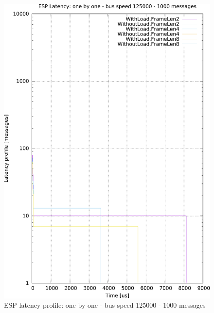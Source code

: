 \documentclass{ctuthesis}
\begin{document}
\begin{figure}[htb]
\includegraphics[width=\linewidth]{figures/speed125000_messages1000_floodFalse.pdf}
\caption{ESP latency profile: one by one - bus speed 125000 - 1000 messages}
\end{figure}
\end{document}
